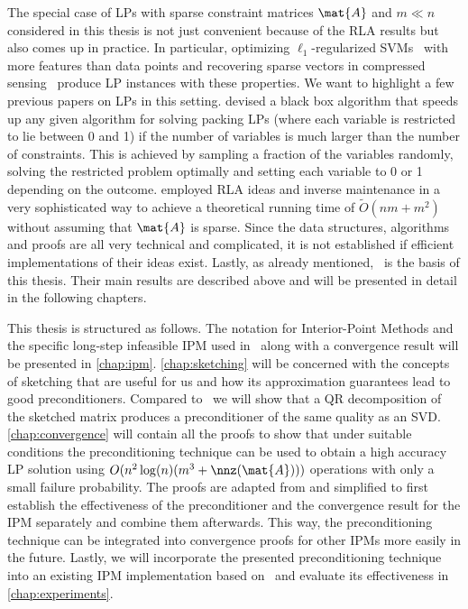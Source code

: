 The special case of LPs with sparse constraint matrices \(\mat{A}\) and \(m \ll n\) considered in this thesis is not just convenient because of the RLA results but also comes up in practice.
In particular, optimizing \(\ell_1\)-regularized SVMs~\cite{ZhuRossetTibshiraniHastie-1normSupportVectorMachines} with more features than data points and recovering sparse vectors in compressed sensing~\cite{YangZhang-l1ProblemsInCompressiveSensing} produce LP instances with these properties.
We want to highlight a few previous papers on LPs in this setting. \textcite{LondonVardiWiermanYi-PackingLinearPrograms} devised a black box algorithm that speeds up any given algorithm for solving packing LPs (where each variable is restricted to lie between 0 and 1) if the number of variables is much larger than the number of constraints.
This is achieved by sampling a fraction of the variables randomly, solving the restricted problem optimally and setting each variable to 0 or 1 depending on the outcome.
\textcite{Sidford-TallDenseLinearPrograms} employed RLA ideas and inverse maintenance in a very sophisticated way to achieve a theoretical running time of \(\tilde{O}(nm + m^2)\) without assuming that \(\mat{A}\) is sparse.
Since the data structures, algorithms and proofs are all very technical and complicated, it is not established if efficient implementations of their ideas exist.
Lastly, as already mentioned,~\cite{Avron-FasterRandomizedInfeasibleIPMs} is the basis of this thesis.
Their main results are described above and will be presented in detail in the following chapters.

This thesis is structured as follows.
The notation for Interior-Point Methods and the specific long-step infeasible IPM used in~\cite{Monteiro-ConvergenceAnalysisLongStepInfeasibleIPMs} along with a convergence result will be presented in \cref{chap:ipm}.
\cref{chap:sketching} will be concerned with the concepts of sketching that are useful for us and how its approximation guarantees lead to good preconditioners.
Compared to~\cite{Avron-FasterRandomizedInfeasibleIPMs} we will show that a QR decomposition of the sketched matrix produces a preconditioner of the same quality as an SVD.
\cref{chap:convergence} will contain all the proofs to show that under suitable conditions the preconditioning technique can be used to obtain a high accuracy LP solution using \(O(n^2 \log(n) (m^3 + \nnz(\mat{A})))\) operations with only a small failure probability.
The proofs are adapted from \textcite{Avron-FasterRandomizedInfeasibleIPMs} and simplified to first establish the effectiveness of the preconditioner and the convergence result for the IPM separately and combine them afterwards.
This way, the preconditioning technique can be integrated into convergence proofs for other IPMs more easily in the future.
Lastly, we will incorporate the presented preconditioning technique into an existing IPM implementation based on~\cite{AndersenAndersen-MosekInteriorPointMethod} and evaluate its effectiveness in \cref{chap:experiments}.

